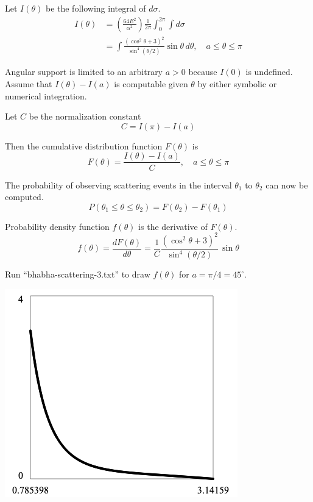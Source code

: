 \documentclass[12pt]{article}
\begin{document}
\bigskip
\noindent
Let $I(\theta)$ be the following integral of $d\sigma$.
\begin{align*}
I(\theta)
&=\left(\frac{64E^2}{\alpha^2}\right)\frac{1}{2\pi}
\int_0^{2\pi}\int d\sigma
\\
&=\int\frac{\left(\cos^2\theta+3\right)^2}{\sin^4(\theta/2)}\sin\theta\,d\theta,
\quad a\le\theta\le\pi
\end{align*}

\noindent
Angular support is limited to an arbitrary $a>0$ because $I(0)$ is undefined.
Assume that $I(\theta)-I(a)$ is computable given $\theta$ by either symbolic or numerical integration.

\bigskip
\noindent
Let $C$ be the normalization constant
\begin{equation*}
C=I(\pi)-I(a)
\end{equation*}

\noindent
Then the cumulative distribution function $F(\theta)$ is
\begin{equation*}
F(\theta)=\frac{I(\theta)-I(a)}{C},
\quad a\le\theta\le\pi
\end{equation*}

\noindent
The probability of observing scattering events in the interval $\theta_1$ to $\theta_2$
can now be computed.
\begin{equation*}
P(\theta_1\le\theta\le\theta_2)=F(\theta_2)-F(\theta_1)
\end{equation*}

\noindent
Probability density function $f(\theta)$ is the derivative of $F(\theta)$.
\begin{equation*}
f(\theta)=\frac{dF(\theta)}{d\theta}
=\frac{1}{C}\frac{\left(\cos^2\theta+3\right)^2}{\sin^4(\theta/2)}\,\sin\theta
\end{equation*}

\noindent
Run ``bhabha-scattering-3.txt'' to draw $f(\theta)$ for $a=\pi/4=45^\circ$.

\begin{center}
\includegraphics[scale=0.5]{bhabha-scattering.png}
\end{center}
\end{document}
